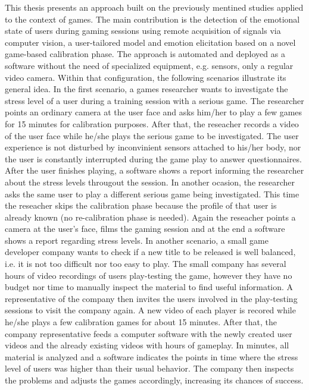 This thesis presents an approach built on the previously mentined studies applied to the context of games. The main contribution is the detection of the emotional state of users during gaming sessions using remote acquisition of signals via computer vision, a user-tailored model and emotion elicitation based on a novel game-based calibration phase. The approach is automated and deployed as a software without the need of specialized equipment, e.g. sensors, only a regular video camera. Within that configuration, the following scenarios illustrate its general idea. In the first scenario, a games researcher wants to investigate the stress level of a user during a training session with a serious game. The researcher points an ordinary camera at the user face and asks him/her to play a few games for 15 minutes for calibration purposes. After that, the reseacher records a video of the user face while he/she plays the serious game to be investigated. The user experience is not disturbed by inconvinient sensors attached to his/her body, nor the user is constantly interrupted during the game play to answer questionnaires. After the user finishes playing, a software shows a report informing the researcher about the stress levels througout the session. In another ocasion, the researcher asks the same user to play a different serious game being investigated. This time the reseacher skips the calibration phase because the profile of that user is already known (no re-calibration phase is needed). Again the reseacher points a camera at the user's face, films the gaming session and at the end a software shows a report regarding stress levels. In another scenario, a small game developer company wants to check if a new title to be released is well balanced, i.e. it is not too difficult nor too easy to play. The small company has several hours of video recordings of users play-testing the game, however they have no budget nor time to manually inspect the material to find useful information. A representative of the company then invites the users involved in the play-testing sessions to visit the company again. A new video of each player is recored while he/she plays a few calibration games for about 15 minutes. After that, the company representative feeds a computer software with the newly created user videos and the already existing videos with hours of gameplay. In minutes, all material is analyzed and a software indicates the points in time where the stress level of users was higher than their usual behavior. The company then inspects the problems and adjusts the games accordingly, increasing its chances of success.

